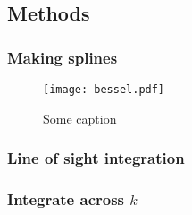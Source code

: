\subsection{Methods}\label{sec:m4:methods}

    \subsubsection{Making splines}
        \begin{figure}
            \texttt{[image: bessel.pdf]}
            \caption{Some caption}
            \label{fig:m3:some}
        \end{figure}

    \subsubsection{Line of sight integration}

    \subsubsection{Integrate across $k$}

